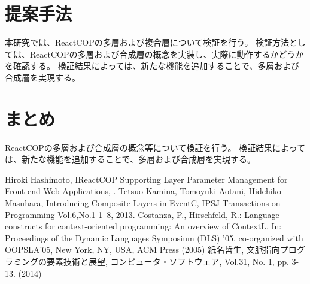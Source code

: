 \documentclass[twocolumn]{jarticle}
\begin{document}
\section{提案手法}
本研究では、ReactCOPの多層および複合層について検証を行う。
検証方法としては、ReactCOPの多層および合成層の概念を実装し、実際に動作するかどうかを確認する。
検証結果によっては、新たな機能を追加することで、多層および合成層を実現する。

\section{まとめ}
ReactCOPの多層および合成層の概念等について検証を行う。
検証結果によっては、新たな機能を追加することで、多層および合成層を実現する。

\begin{thebibliography}{1}
Hiroki Hashimoto, IReactCOP Supporting Layer Parameter Management for Front-end Web Applications, .
Tetsuo Kamina, Tomoyuki Aotani, Hidehiko Masuhara, Introducing Composite Layers in EventC, IPSJ Transactions on Programming Vol.6,No.1 1–8, 2013.
Costanza, P., Hirschfeld, R.: Language constructs for context-oriented programming: An overview of ContextL. In: Proceedings of the Dynamic Languages Symposium (DLS) ’05, co-organized with OOPSLA’05, New York, NY, USA, ACM
Press (2005)
紙名哲生, 文脈指向プログラミングの要素技術と展望, コンピュータ・ソフトウェア, Vol.31, No. 1, pp. 3-13. (2014)
\end{thebibliography}
\end{document}

